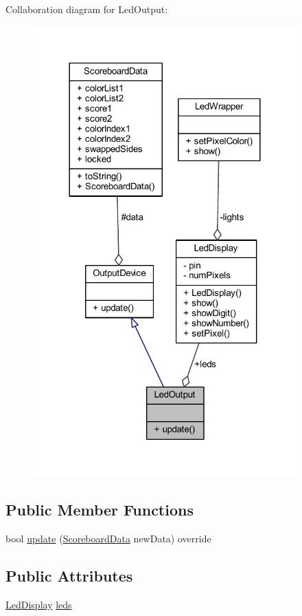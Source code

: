 Collaboration diagram for Led\+Output\+:
\nopagebreak
\begin{figure}[H]
\begin{center}
\leavevmode
\includegraphics[width=288pt]{class_led_output__coll__graph}
\end{center}
\end{figure}
\subsection*{Public Member Functions}
\begin{DoxyCompactItemize}
\item 
bool \hyperlink{class_led_output_a553af18fe51a31ee3d5b94d9598503da}{update} (\hyperlink{struct_scoreboard_data}{Scoreboard\+Data} new\+Data) override
\end{DoxyCompactItemize}
\subsection*{Public Attributes}
\begin{DoxyCompactItemize}
\item 
\hyperlink{class_led_display}{Led\+Display} \hyperlink{class_led_output_a79e4a1c6bf8b16fbabf7ef17a870d83d}{leds}
\end{DoxyCompactItemize}
